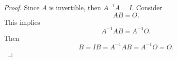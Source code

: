 \begin{Exercise}
\begin{proof}
Since $A$ is invertible, then $A^{-1} A = I$. Consider
$$
AB = O.
$$
This implies
$$
A^{-1} A B = A^{-1} O.
$$
Then
$$
B = I B = A^{-1} A B = A^{-1} O = O.
$$
\end{proof}
\end{Exercise}